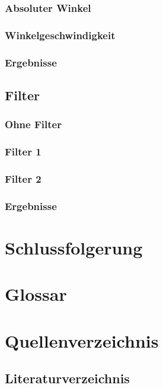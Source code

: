 \documentclass[12pt,a4paper, ngerman]{article}
\begin{document}
\subsubsection{Absoluter Winkel}

\subsubsection{Winkelgeschwindigkeit}

\subsubsection{Ergebnisse}

\subsection{Filter}

\subsubsection{Ohne Filter}

\subsubsection{Filter 1}

\subsubsection{Filter 2}

\subsubsection{Ergebnisse}

\section{Schlussfolgerung}




\newpage
\section{Glossar}


\newpage
\section{Quellenverzeichnis}
\subsection{Literaturverzeichnis}
\printbibliography
\end{document}
